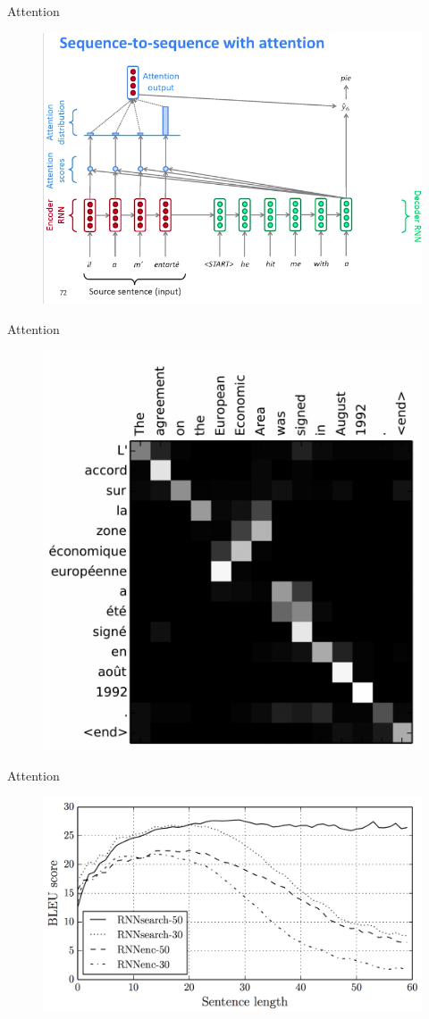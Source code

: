 \documentclass[notes,12pt, aspectratio=169]{beamer}
\begin{document}
\begin{frame}{Attention}

\begin{figure}
	\centering
	\includegraphics[width=0.7\linewidth]{images/attention_3}
	\label{fig:seq2seq}
\end{figure}
\end{frame}

\begin{frame}{Attention}

\begin{figure}
	\centering
	\includegraphics[width=0.5\linewidth]{images/undestend_attention}
	\label{fig:seq2seq}
\end{figure}
\end{frame}


\begin{frame}{Attention}

\begin{figure}
	\centering
	\includegraphics[width=1\linewidth]{images/bahdanau_attn}
	\label{fig:seq2seq}
\end{figure}
\end{frame}
\end{document}
